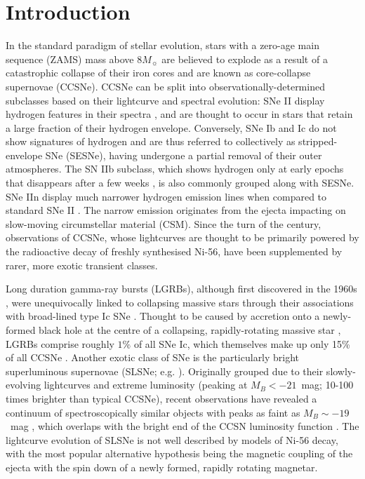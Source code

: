 \documentclass[fleqn,usenatbib,]{mnras}
\newcommand{\replyref}[1]{\color{magenta}#1 \color{black}}
\begin{document}


\section{Introduction}

In the standard paradigm of stellar evolution, stars with a zero-age main sequence (ZAMS) mass above $8M_{\sun}$ are believed to explode as a result of a catastrophic collapse of their iron cores and are known as core-collapse supernovae (CCSNe). CCSNe can be split into observationally-determined subclasses based on their lightcurve and spectral evolution: SNe II display hydrogen features in their spectra \citep{Minkowski1941}, and are thought to occur in stars that retain a large fraction of their hydrogen envelope. Conversely, SNe Ib and Ic do not show signatures of hydrogen \citep[e.g.][]{Filippenko1997} and are thus referred to collectively as stripped-envelope SNe (SESNe), having undergone a partial removal of their outer atmospheres. The SN IIb subclass, which shows hydrogen only at early epochs that disappears after a few weeks \citep{Filippenko1988}, is also commonly grouped along with SESNe. SNe IIn display much narrower hydrogen emission lines when compared to standard SNe II \citep{Schlegel1990}. The narrow emission originates from the ejecta impacting on slow-moving circumstellar material (CSM). Since the turn of the century, observations of CCSNe, whose lightcurves are \replyref{thought to be} primarily powered by the radioactive decay of freshly synthesised Ni-56, have been supplemented by rarer, more exotic transient classes.

 Long duration gamma-ray bursts (LGRBs), although first discovered in the 1960s \citep{Klebesadel1973}, were unequivocally linked to collapsing massive stars through their associations with broad-lined type Ic SNe \citep{Galama1998,Hjorth2003}. Thought to be caused by accretion onto a newly-formed black hole at the centre of a collapsing, rapidly-rotating massive star \citep[e.g.][]{Woosley1993,Woosley2006a,Woosley2006b}, LGRBs comprise roughly $1\%$ of all SNe Ic, which themselves make up only 15\% of all CCSNe \citep{Kelly2012,Graham2016}. Another exotic class of SNe is the particularly bright superluminous supernovae (SLSNe; e.g. \citealt{Quimby2011, Gal-Yam2012}). Originally grouped due to their slowly-evolving lightcurves and extreme luminosity (peaking at $M_B < -21$~mag; 10-100 times brighter than typical CCSNe), recent observations have revealed a continuum of spectroscopically similar objects with peaks as faint as $M_B \sim -19$~mag \citep{DeCia2018,Lunnan2018,Angus2019}, which overlaps with the bright end of the CCSN luminosity function \citep{Li2011}. The lightcurve evolution of SLSNe is not well described by models of Ni-56 decay, with the most popular alternative hypothesis being the magnetic coupling of the ejecta with the spin down of a newly formed, rapidly rotating magnetar.
 
\end{document}

